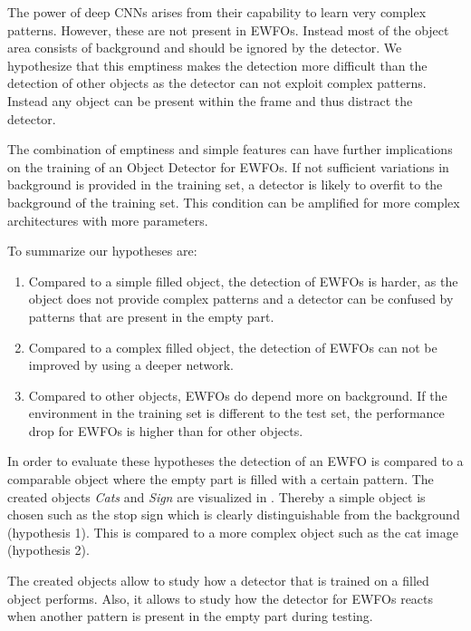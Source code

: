 The power of deep \acp{CNN} arises from their capability to learn very complex patterns. However, these are not present in \acp{EWFO}. Instead most of the object area consists of background and should be ignored by the detector. We hypothesize that this emptiness makes the detection more difficult than the detection of other objects as the detector can not exploit complex patterns. Instead any object can be present within the frame and thus distract the detector.

The combination of emptiness and simple features can have further implications on the training of an Object Detector for \acp{EWFO}. If not sufficient variations in background is provided in the training set, a detector is likely to overfit to the background of the training set. This condition can be amplified for more complex architectures with more parameters.

To summarize our hypotheses are:
\begin{enumerate}
	\item Compared to a simple filled object, the detection of \acp{EWFO} is harder, as the object does not provide complex patterns and a detector can be confused by patterns that are present in the empty part. 
	\item Compared to a complex filled object, the detection of \acp{EWFO} can not be improved by using a deeper network.
	\item Compared to other objects, \acp{EWFO} do depend more on background. If the environment in the training set is different to the test set, the performance drop for \acp{EWFO} is higher than for other objects. 
\end{enumerate}

In order to evaluate these hypotheses the detection of an \ac{EWFO} is compared to a comparable object where the empty part is filled with a certain pattern. The created objects \textit{Cats} and \textit{Sign} are visualized in . Thereby a simple object is chosen such as the stop sign which is clearly distinguishable from the background (hypothesis 1). This is compared to a more complex object such as the cat image (hypothesis 2).

The created objects allow to study how a detector that is trained on a filled object performs. Also, it allows to study how the detector for \acp{EWFO} reacts when another pattern is present in the empty part during testing.

